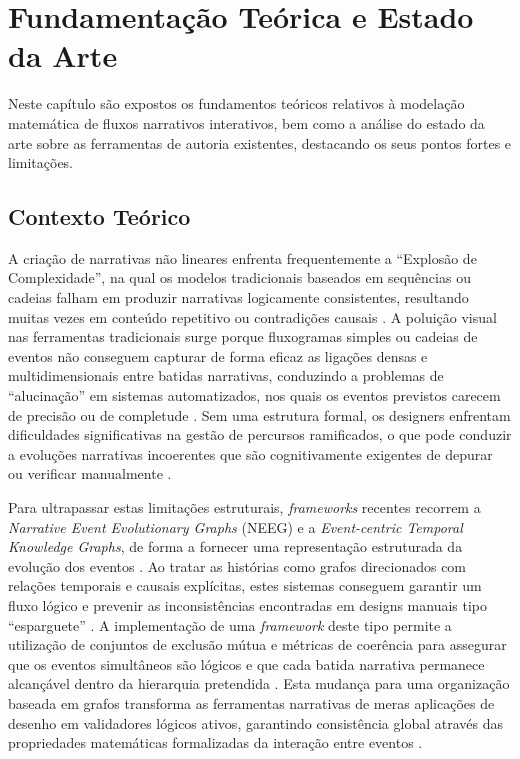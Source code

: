 \chapter{Fundamentação Teórica e Estado da Arte}
\label{cp:fundamentacao-teorica}

Neste capítulo são expostos os fundamentos teóricos relativos à modelação matemática de fluxos narrativos interativos, bem como a análise do estado da arte sobre as ferramentas de autoria existentes, destacando os seus pontos fortes e limitações.

\section{Contexto Teórico}
\label{sec:contexto-teorico}

A criação de narrativas não lineares enfrenta frequentemente a ``Explosão de Complexidade'', na qual os modelos tradicionais baseados em sequências ou cadeias falham em produzir narrativas logicamente consistentes, resultando muitas vezes em conteúdo repetitivo ou contradições causais \citep{Chen2021GraphPlan}. A poluição visual nas ferramentas tradicionais surge porque fluxogramas simples ou cadeias de eventos não conseguem capturar de forma eficaz as ligações densas e multidimensionais entre batidas narrativas, conduzindo a problemas de ``alucinação'' em sistemas automatizados, nos quais os eventos previstos carecem de precisão ou de completude \citep{Li2018NEEG}. Sem uma estrutura formal, os designers enfrentam dificuldades significativas na gestão de percursos ramificados, o que pode conduzir a evoluções narrativas incoerentes que são cognitivamente exigentes de depurar ou verificar manualmente \citep{Mormoris2024Comparing}.

Para ultrapassar estas limitações estruturais, \textit{frameworks} recentes recorrem a \textit{Narrative Event Evolutionary Graphs} (NEEG) e a \textit{Event-centric Temporal Knowledge Graphs}, de forma a fornecer uma representação estruturada da evolução dos eventos \citep{Li2018NEEG, YanTang2023Narrative}. Ao tratar as histórias como grafos direcionados com relações temporais e causais explícitas, estes sistemas conseguem garantir um fluxo lógico e prevenir as inconsistências encontradas em designs manuais tipo ``esparguete'' \citep{Chen2021GraphPlan, Li2018NEEG, Tang2022NGEP}. A implementação de uma \textit{framework} deste tipo permite a utilização de conjuntos de exclusão mútua e métricas de coerência para assegurar que os eventos simultâneos são lógicos e que cada batida narrativa permanece alcançável dentro da hierarquia pretendida \citep{Chen2021GraphPlan}. Esta mudança para uma organização baseada em grafos transforma as ferramentas narrativas de meras aplicações de desenho em validadores lógicos ativos, garantindo consistência global através das propriedades matemáticas formalizadas da interação entre eventos \citep{Chen2021GraphPlan, Tang2022NGEP}.

